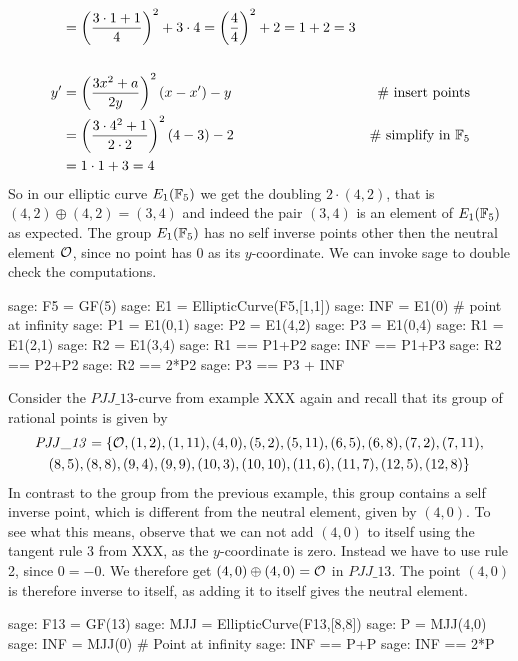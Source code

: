 \begin{example}
\begin{align*}
    & = \left(\frac{3\cdot 1+1}{4}\right)^2 +3\cdot 4
      = \left(\frac{4}{4}\right)^2 +2
      = 1 +2 
      = 3
\\
\\
y'  & = \left(\frac{3x^2+a}{2y}\right)^2\left(x-x'\right) - y  & \text{\# insert points} \\
    & = \left(\frac{3\cdot 4^2+1}{2\cdot 2}\right)^2\left(4-3\right) - 2 & \text{\# simplify in } \mathbb{F}_5\\
    & = 1\cdot 1 + 3
      = 4
\end{align*}
So in our elliptic curve $E_1(\mathbb{F}_5)$ we get the doubling $2\cdot (4,2)$, that is $(4,2)\oplus (4,2) =(3,4)$ and indeed the pair $(3,4)$ is an element of $E_1(\mathbb{F}_5)$ as expected. The group $E_1(\mathbb{F}_5)$ has no self inverse points other then the neutral element $\mathcal{O}$, since no point has $0$ as its $y$-coordinate. We can invoke sage to double check the computations. 
\begin{sagecommandline}
sage: F5 = GF(5)
sage: E1 = EllipticCurve(F5,[1,1])
sage: INF = E1(0) # point at infinity
sage: P1 = E1(0,1)
sage: P2 = E1(4,2)
sage: P3 = E1(0,4)
sage: R1 = E1(2,1)
sage: R2 = E1(3,4)
sage: R1 == P1+P2
sage: INF == P1+P3
sage: R2 == P2+P2
sage: R2 == 2*P2
sage: P3 == P3 + INF
\end{sagecommandline}
\end{example}
\begin{example} Consider the $\mathit{PJJ\_13}$-curve from example XXX again and recall that its group of rational points is given by 
\begin{multline*}
\mathit{PJJ\_13} = \{\mathcal{O}, (1, 2), (1, 11), (4, 0), (5, 2), (5, 11), (6, 5), (6, 8), (7,2), (7, 11), \\ (8, 5), (8, 8), (9, 4), (9, 9), (10, 3), (10,
10), (11, 6), (11, 7), (12, 5), (12, 8)\}
\end{multline*}
In contrast to the group from the previous example, this group contains a self inverse point, which is different from the neutral element, given by $(4,0)$. To see what this means, observe that we can not add $(4,0)$ to itself using the tangent rule 3 from XXX, as the $y$-coordinate is zero. Instead we have to use rule 2, since $0=-0$. We therefore get $(4,0)\oplus (4,0)=\mathcal{O}$ in $\mathit{PJJ\_13}$. The point $(4,0)$ is therefore inverse to itself, as adding it to itself gives the neutral element. 
\begin{sagecommandline}
sage: F13 = GF(13)
sage: MJJ = EllipticCurve(F13,[8,8])
sage: P = MJJ(4,0)
sage: INF = MJJ(0) # Point at infinity
sage: INF == P+P
sage: INF == 2*P
\end{sagecommandline}
\end{example}
